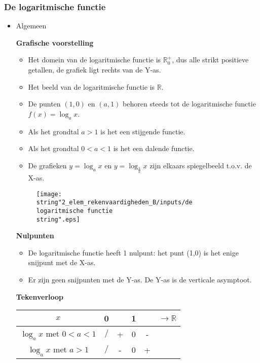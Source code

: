 \subsubsection{De logaritmische functie}

\begin{itemize}
\item{Algemeen}

\noindent \textbf{Grafische voorstelling}
\begin{itemize}
	\item Het domein van de logaritmische functie is $\mathbb{R}_{0}^{+}$,
	dus alle strikt positieve getallen, de grafiek ligt rechts van de
	Y-as.
	\item Het beeld van de logaritmische functie is ${\displaystyle \mathbb{R}}$.
	\item De punten $(1,0)$ en $(a,1)$ behoren steeds tot de logaritmische
	functie ${\displaystyle f(x)=\log_{a}x}$.
	\item Als het grondtal $a>1$ is het een stijgende functie.
	\item Als het grondtal $0<a<1$ is het een dalende functie.
	\item De grafieken ${\displaystyle y=\log_{a}x}$ en ${\displaystyle y=\log_{\frac{1}{a}}x}$
	zijn elkaars spiegelbeeld t.o.v. de X-as.
\end{itemize}
\begin{figure}
	\texttt{[image: \\string"2\_elem\_rekenvaardigheden\_B/inputs/de logaritmische functie\\string".eps]}
\end{figure}


\noindent \textbf{Nulpunten}
\begin{itemize}
	\item De logaritmische functie heeft 1 nulpunt: het punt (1,0) is het enige
	snijpunt met de X-as. 
	\item Er zijn geen snijpunten met de Y-as. De Y-as is de verticale asymptoot.
\end{itemize}
\noindent \textbf{Tekenverloop}

\begin{tabular}{|c||c|c|c|c|c|}
	\hline 
	$x$ & 0 &  & 1 &  & ${\displaystyle \longrightarrow\mathbb{R}}$\tabularnewline
	\hline 
	\hline 
	${\displaystyle \log_{a}x}$ met $0<a<1$ & $/$ & + & 0 & - & \multicolumn{1}{c|}{}\tabularnewline
	\hline 
	${\displaystyle \log_{a}x}$ met $a>1$ & $/$ & - & 0 & + & \multicolumn{1}{c|}{}\tabularnewline
	\hline 
\end{tabular}



\end{itemize}
